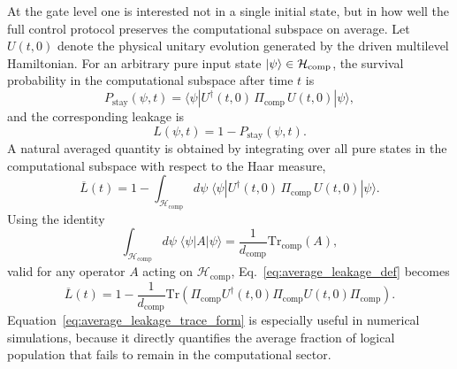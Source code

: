 At the gate level one is interested not in a single initial state, but in how well the full control protocol preserves the computational subspace on average. Let $U(t,0)$ denote the physical unitary evolution generated by the driven multilevel Hamiltonian. For an arbitrary pure input state $\ket{\psi} \in \mathcal{H}_{\mathrm{comp}}$, the survival probability in the computational subspace after time $t$ is
\begin{equation}
P_{\mathrm{stay}}(\psi,t)
=
\langle \psi | U^{\dagger}(t,0)\,\Pi_{\mathrm{comp}}\,U(t,0) | \psi \rangle,
\label{eq:survival_probability_state}
\end{equation}
and the corresponding leakage is
\begin{equation}
L(\psi,t)
=
1-P_{\mathrm{stay}}(\psi,t).
\label{eq:state_leakage_from_unitary}
\end{equation}
A natural averaged quantity is obtained by integrating over all pure states in the computational subspace with respect to the Haar measure,
\begin{equation}
\overline{L}(t)
=
1-
\int_{\mathcal{H}_{\mathrm{comp}}} d\psi \;
\langle \psi | U^{\dagger}(t,0)\,\Pi_{\mathrm{comp}}\,U(t,0) | \psi \rangle.
\label{eq:average_leakage_def}
\end{equation}
Using the identity
\begin{equation}
\int_{\mathcal{H}_{\mathrm{comp}}} d\psi \; \langle \psi | A | \psi \rangle
=
\frac{1}{d_{\mathrm{comp}}}\mathrm{Tr}_{\mathrm{comp}}(A),
\label{eq:haar_average_identity}
\end{equation}
valid for any operator $A$ acting on $\mathcal{H}_{\mathrm{comp}}$, Eq.~\eqref{eq:average_leakage_def} becomes
\begin{equation}
\overline{L}(t)
=
1-\frac{1}{d_{\mathrm{comp}}}
\mathrm{Tr}
\!\left(
\Pi_{\mathrm{comp}} U^{\dagger}(t,0)\Pi_{\mathrm{comp}}U(t,0)\Pi_{\mathrm{comp}}
\right).
\label{eq:average_leakage_trace_form}
\end{equation}
Equation~\eqref{eq:average_leakage_trace_form} is especially useful in numerical simulations, because it directly quantifies the average fraction of logical population that fails to remain in the computational sector.

